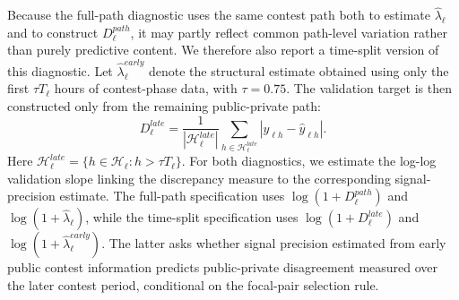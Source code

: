 \documentclass[mnsc]{informs3}
\begin{document}
Because the full-path diagnostic uses the same contest path both to estimate $\hat\lambda_\ell$ and to construct $D_\ell^{path}$, it may partly reflect common path-level variation rather than purely predictive content.
We therefore also report a time-split version of this diagnostic.
Let $\hat\lambda_\ell^{early}$ denote the structural estimate obtained using only the first $\tau T_\ell$ hours of contest-phase data, with $\tau=0.75$.
The validation target is then constructed only from the remaining public-private path:
\[
D_\ell^{late}
=
\frac{1}{|\mathcal H_\ell^{late}|}
\sum_{h\in\mathcal H_\ell^{late}}
\left|y_{\ell h}-\hat y_{\ell h}\right|.
\]
Here $\mathcal H_\ell^{late}=\{h\in\mathcal H_\ell:h>\tau T_\ell\}$.
For both diagnostics, we estimate the log-log validation slope linking the discrepancy measure to the corresponding signal-precision estimate.
The full-path specification uses $\log(1+D_\ell^{path})$ and $\log(1+\hat\lambda_\ell)$, while the time-split specification uses $\log(1+D_\ell^{late})$ and $\log(1+\hat\lambda_\ell^{early})$.
The latter asks whether signal precision estimated from early public contest information predicts public-private disagreement measured over the later contest period, conditional on the focal-pair selection rule.
\end{document}
